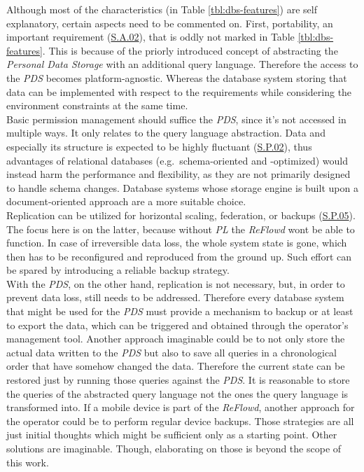 \documentclass[12pt,english,a4paper,titlepage,cleardoublepage=empty,dottedtoc]{report}
\begin{document}
Although most of the characteristics (in Table \ref{tbl:dbs-features})
are self explanatory, certain aspects need to be commented on. First,
portability, an important requirement
(\protect\hyperlink{sa02}{S.A.02}), that is oddly not marked in Table
\ref{tbl:dbs-features}. This is because of the priorly introduced
concept of abstracting the \emph{Personal Data Storage} with an
additional query language. Therefore the access to the \emph{PDS}
becomes platform-agnostic. Whereas the database system storing that data
can be implemented with respect to the requirements while considering
the environment constraints at the same time.\\
Basic permission management should suffice the \emph{PDS}, since it's
not accessed in multiple ways. It only relates to the query language
abstraction. Data and especially its structure is expected to be highly
fluctuant (\protect\hyperlink{sp02}{S.P.02}), thus advantages of
relational databases (e.g.~schema-oriented and -optimized) would instead
harm the performance and flexibility, as they are not primarily designed
to handle schema changes. Database systems whose storage engine is built
upon a document-oriented approach are a more suitable choice.\\
Replication can be utilized for horizontal scaling, federation, or
backups (\protect\hyperlink{sp05}{S.P.05}). The focus here is on the
latter, because without \emph{PL} the \emph{ReFlowd} wont be able to
function. In case of irreversible data loss, the whole system state is
gone, which then has to be reconfigured and reproduced from the ground
up. Such effort can be spared by introducing a reliable backup
strategy.\\
With the \emph{PDS}, on the other hand, replication is not necessary,
but, in order to prevent data loss, still needs to be addressed.
Therefore every database system that might be used for the \emph{PDS}
must provide a mechanism to backup or at least to export the data, which
can be triggered and obtained through the operator's management tool.
Another approach imaginable could be to not only store the actual data
written to the \emph{PDS} but also to save all queries in a
chronological order that have somehow changed the data. Therefore the
current state can be restored just by running those queries against the
\emph{PDS}. It is reasonable to store the queries of the abstracted
query language not the ones the query language is transformed into. If a
mobile device is part of the \emph{ReFlowd}, another approach for the
operator could be to perform regular device backups. Those strategies
are all just initial thoughts which might be sufficient only as a
starting point. Other solutions are imaginable. Though, elaborating on
those is beyond the scope of this work.
\end{document}
